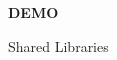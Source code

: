 \begin{frame}

\begin{center}

\Huge \textbf{DEMO}

\bigskip

\large Shared Libraries

\end{center}

\end{frame}
